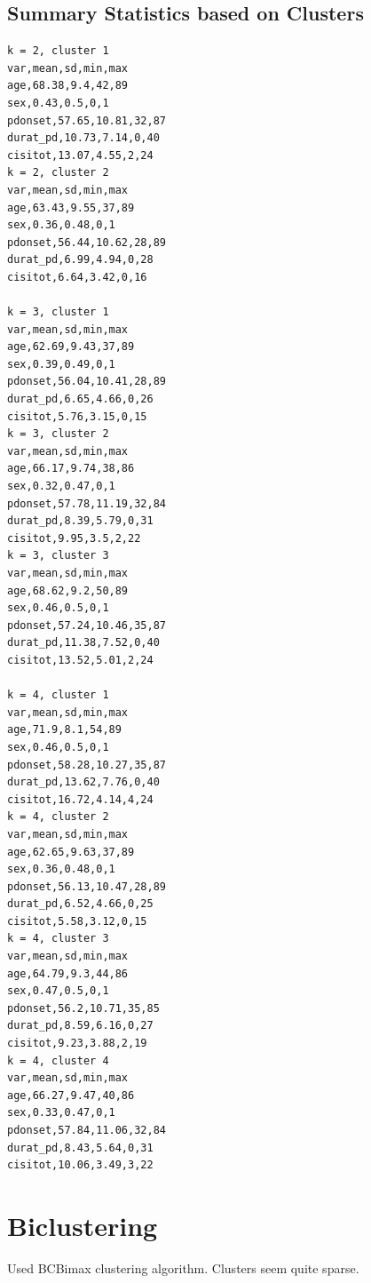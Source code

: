 \documentclass[letterpaper,12pt]{article}
\begin{document}
\subsection{Summary Statistics based on Clusters}

\begin{lstlisting}
k = 2, cluster 1
var,mean,sd,min,max
age,68.38,9.4,42,89
sex,0.43,0.5,0,1
pdonset,57.65,10.81,32,87
durat_pd,10.73,7.14,0,40
cisitot,13.07,4.55,2,24
k = 2, cluster 2
var,mean,sd,min,max
age,63.43,9.55,37,89
sex,0.36,0.48,0,1
pdonset,56.44,10.62,28,89
durat_pd,6.99,4.94,0,28
cisitot,6.64,3.42,0,16

k = 3, cluster 1
var,mean,sd,min,max
age,62.69,9.43,37,89
sex,0.39,0.49,0,1
pdonset,56.04,10.41,28,89
durat_pd,6.65,4.66,0,26
cisitot,5.76,3.15,0,15
k = 3, cluster 2
var,mean,sd,min,max
age,66.17,9.74,38,86
sex,0.32,0.47,0,1
pdonset,57.78,11.19,32,84
durat_pd,8.39,5.79,0,31
cisitot,9.95,3.5,2,22
k = 3, cluster 3
var,mean,sd,min,max
age,68.62,9.2,50,89
sex,0.46,0.5,0,1
pdonset,57.24,10.46,35,87
durat_pd,11.38,7.52,0,40
cisitot,13.52,5.01,2,24

k = 4, cluster 1
var,mean,sd,min,max
age,71.9,8.1,54,89
sex,0.46,0.5,0,1
pdonset,58.28,10.27,35,87
durat_pd,13.62,7.76,0,40
cisitot,16.72,4.14,4,24
k = 4, cluster 2
var,mean,sd,min,max
age,62.65,9.63,37,89
sex,0.36,0.48,0,1
pdonset,56.13,10.47,28,89
durat_pd,6.52,4.66,0,25
cisitot,5.58,3.12,0,15
k = 4, cluster 3
var,mean,sd,min,max
age,64.79,9.3,44,86
sex,0.47,0.5,0,1
pdonset,56.2,10.71,35,85
durat_pd,8.59,6.16,0,27
cisitot,9.23,3.88,2,19
k = 4, cluster 4
var,mean,sd,min,max
age,66.27,9.47,40,86
sex,0.33,0.47,0,1
pdonset,57.84,11.06,32,84
durat_pd,8.43,5.64,0,31
cisitot,10.06,3.49,3,22
\end{lstlisting}
\section{Biclustering}

Used BCBimax clustering algorithm. Clusters seem quite sparse.
\end{document}
